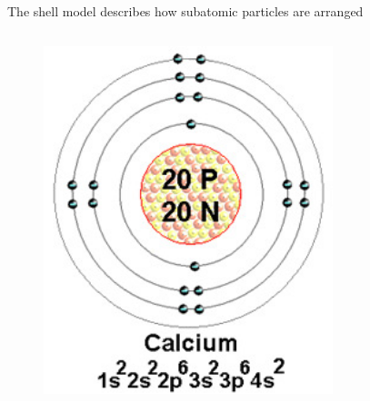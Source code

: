 \documentclass[aspectratio=1610,pdftex,dvipsnames,compress,xcolor={dvipsnames}]{beamer}
\begin{document}
\addtocounter{framenumber}{-1}
\begin{frame}{The shell model describes how subatomic particles are arranged}
    \begin{columns}

        \begin{column}{0.50\textwidth}
            \begin{figure}
                \centering
                \includegraphics[width=0.75\textwidth]{calcium.jpg}
            \end{figure}
        \end{column}


\end{columns}
\end{frame}
\end{document}
